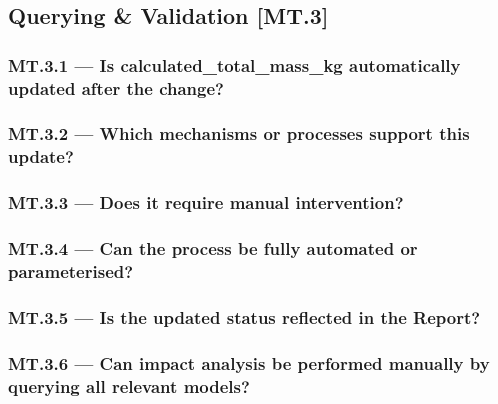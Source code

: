 \documentclass[sigconf]{acmart}
\begin{document}
\subsection{Querying \& Validation [MT.3]}
\label{sec:MT3}

\subsubsection*{MT.3.1 --- Is \textsf{calculated\_total\_mass\_kg} automatically updated after the change?}
\label{sec:MT3-1}



\subsubsection*{MT.3.2 --- Which mechanisms or processes support this update?}
\label{sec:MT3-2}



\subsubsection*{MT.3.3 --- Does it require manual intervention?}
\label{sec:MT3-3}



\subsubsection*{MT.3.4 --- Can the process be fully automated or parameterised?}
\label{sec:MT3-4}



\subsubsection*{MT.3.5 --- Is the updated status reflected in the Report?}
\label{sec:MT3-5}



\subsubsection*{MT.3.6 --- Can impact analysis be performed manually by querying all relevant models?}
\label{sec:MT3-6}
\end{document}
